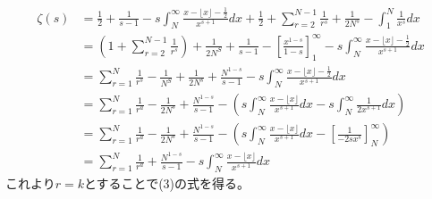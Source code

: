 \documentclass{jsarticle}
\begin{document}
\begin{align*}
\zeta(s)&=\frac{1}{2}+\frac{1}{s-1}-s\int_{N}^{\infty}\frac{x-\lfloor x\rfloor-\frac{1}{2}}{x^{s+1}}dx+\frac{1}{2}+\sum_{r=2}^{N-1}\frac{1}{r^s}+\frac{1}{2N^{s}}-\int_{1}^{N}\frac{1}{x^{s}}dx\\
&=\left(1+\sum_{r=2}^{N-1}\frac{1}{r^s}\right)+\frac{1}{2N^{S}}+\frac{1}{s-1}-\left[\frac{x^{1-s}}{1-s}\right]_{1}^{\infty}-s\int_{N}^{\infty}\frac{x-\lfloor x\rfloor-\frac{1}{2}}{x^{s+1}}dx\\
&=\sum_{r=1}^{N}\frac{1}{r^{s}}-\frac{1}{N^{S}}+\frac{1}{2N^{s}}+\frac{N^{1-s}}{s-1}-s\int_{N}^{\infty}\frac{x-\lfloor x\rfloor-\frac{1}{2}}{x^{s+1}}dx\\
&=\sum_{r=1}^{N}\frac{1}{r^{a}}-\frac{1}{2N^{s}}+\frac{N^{1-s}}{s-1}-\left(s\int_{N}^{\infty}\frac{x-\lfloor x\rfloor}{x^{s+1}}dx-s\int_{N}^{\infty}\frac{1}{2x^{s+1}}dx\right)\\
&=\sum_{r=1}^{N}\frac{1}{r^{a}}-\frac{1}{2N^{s}}+\frac{N^{1-s}}{s-1}-\left(s\int_{N}^{\infty}\frac{x-\lfloor x\rfloor}{x^{s+1}}dx-\left[\frac{1}{-2sx^{s}}\right]_{N}^{\infty}\right)\\
&=\sum_{r=1}^{N}\frac{1}{r^{a}}+\frac{N^{1-s}}{s-1}-s\int_{N}^{\infty}\frac{x-\lfloor x\rfloor}{x^{s+1}}dx
\end{align*}
これより\(r=k\)とすることで(3)の式を得る。
　　　　　　　　　　　　　
             




\setcounter{equation}{0}
\end{document}
